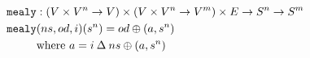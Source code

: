 \documentclass[preview]{standalone}
\begin{document}
\begin{align*}
  \texttt{mealy} &: (V \times V^n \rightarrow V) \times (V \times V^n  \rightarrow V^m) \times E
                   \rightarrow S^n \rightarrow S^m \\
  \texttt{mealy} &(ns,od,i)(s^n) = od \oplus (a,s^n) \\
                 &\text{where}\ a = i \mathbin{\Delta} ns \oplus (a, s^n)
\end{align*}
\end{document}
